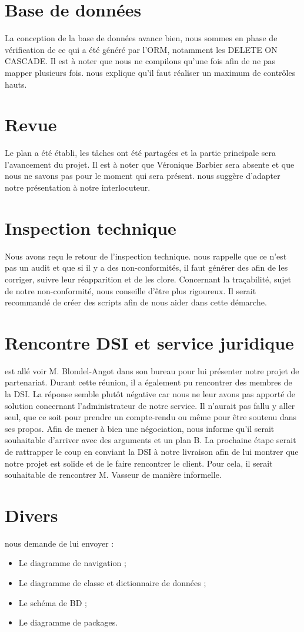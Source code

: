 \documentclass [a4paper] {article}
\begin{document}
\section{Base de données}
La conception de la base de données avance bien, nous sommes en phase de vérification de ce qui a été généré par l'ORM, notamment les DELETE ON CASCADE. Il est à noter que nous ne compilons qu'une fois afin de ne pas mapper plusieurs fois. \nomTuteurPedago{} nous explique qu'il faut réaliser un maximum de contrôles hauts.

\section{Revue}
Le plan a été établi, les tâches ont été partagées et la partie principale sera l'avancement du projet. Il est à noter que Véronique Barbier sera absente et que nous ne savons pas pour le moment qui sera présent. \nomTuteurPedago{} nous suggère d'adapter notre présentation à notre interlocuteur.

\section{Inspection technique}
Nous avons reçu le retour de l'inspection technique. \nomTuteurPedago{} nous rappelle que ce n'est pas un audit et que si il y a des non-conformités, il faut générer des \FT{} afin de les corriger, suivre leur réapparition et de les clore.
Concernant la traçabilité, sujet de notre non-conformité, \nomTuteurPedago{} nous conseille d'être plus rigoureux. Il serait recommandé de créer des scripts afin de nous aider dans cette démarche.


\section{Rencontre DSI et service juridique}
\Sergi{} est allé voir M. Blondel-Angot dans son bureau pour lui présenter notre projet de partenariat. Durant cette réunion, il a également pu rencontrer des membres de la DSI. La réponse semble plutôt négative car nous ne leur avons pas apporté de solution concernant l'administrateur de notre service. Il n'aurait pas fallu y aller seul, que ce soit pour prendre un compte-rendu ou même pour être soutenu dans ses propos. Afin de mener à bien une négociation, \nomTuteurPedago{} nous informe qu'il serait souhaitable d'arriver avec des arguments et un plan B. La prochaine étape serait de rattrapper le coup en conviant la DSI à notre livraison afin de lui montrer que notre projet  est solide et de le faire rencontrer le client. Pour cela, il serait souhaitable de rencontrer M. Vasseur de manière informelle.


\section{Divers}
\nomTuteurPedago{} nous demande de lui envoyer : 
\begin{itemize}
\item Le diagramme de navigation ;
\item Le diagramme de classe et dictionnaire de données ;
\item Le schéma de BD ;
\item Le diagramme de packages.
\end{itemize}



\newpage
\end{document}
